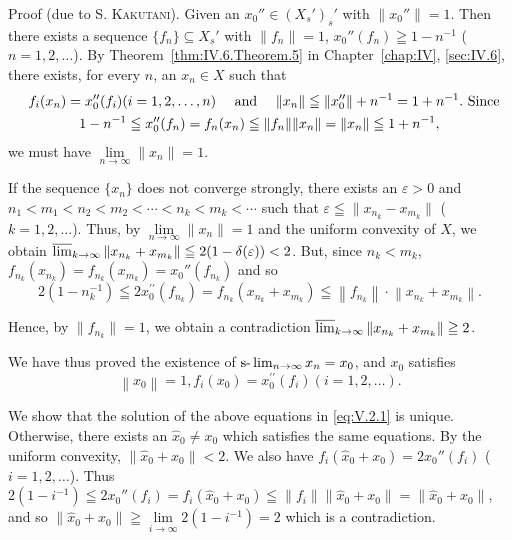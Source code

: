 Proof (due to S. \textsc{Kakutani}). Given an $x_0'' \in (X_s')_s'$ with $\|x_0''\| = 1$. Then there exists a sequence $\{f_n\} \subseteq X_s'$ with $\|f_n\| = 1$, $x_0''(f_n) \geqq 1 - n^{-1}$ ( $n = 1, 2, \ldots$). By Theorem~\ref{thm:IV.6.Theorem.5} in Chapter~\ref{chap:IV}, \ref{sec:IV.6}, there exists, for every $n$, an $x_n \in X$ such that 
\begin{gather}\quad f _{i} (x _{n})= x _{0} ^{\prime \prime} (f _{i}) (i = 1, 2, \dots , n) \quad \text{ and } \quad \| x _{n} \| \leqq \| x _{0} ^{\prime \prime} \| + n ^{-1} = 1 + n ^{-1}. \text{ Since } \notag
\\1 - n ^{-1} \leqq x _{0} ^{\prime \prime} (f _{n}) = f _{n} (x _{n}) \leqq \| f _{n} \| \| x _{n} \| = \| x _{n} \| \leqq 1 + n ^{-1}, \notag
\end{gather}
we must have $\lim\limits_{n\to \infty}\|x_n\| = 1.$ 

If the sequence $\{x_{n}\}$ does not converge strongly, there exists an $\varepsilon > 0$ and $n_{1} < m_{1} < n_{2} < m_{2} < \cdots < n_{k} < m_{k} < \cdots$ such that $\varepsilon \leqq \|x_{n_{k}} - x_{m_{k}}\|$ ( $k = 1, 2, \ldots$). Thus, by $\lim\limits_{n \to \infty} \|x_n\| = 1$ and the uniform convexity of $X$, we obtain $\varlimsup\limits_{k \to \infty} \|x_{n_{k}} + x_{m_{k}}\| \leqq 2(1 - \delta(\varepsilon)) < 2$. But, since $n_k < m_k$, $f_{n_{k}}(x_{n_{k}}) = f_{n_{k}}(x_{m_{k}}) = x_0''(f_{n_{k}})$ and so 
\[
2 \left(1 - n _{k} ^{-1}\right) \leqq 2 x _{0} ^{\prime \prime} \left(f _ {n _{k}}\right) = f _ {n _{k}} \left(x _ {n _{k}} + x _ {m _{k}}\right) \leqq \left\| f _ {n _{k}} \right\| \cdot \left\| x _ {n _{k}} + x _ {m _{k}} \right\|.
\]

Hence, by $\| f_{n_{k}} \| = 1$, we obtain a contradiction $\varlimsup\limits_{k \to \infty} \| x_{n_{k}} + x_{m_{k}} \| \geqq 2$. 

We have thus proved the existence of $\slim\limits_{n \to \infty} x_n = x_0$, and $x_0$ satisfies 
\begin{equation}\label{eq:V.2.1}
\left\| x _{0} \right\| = 1, f _{i} (x _{0}) = x _{0} ^{\prime \prime} (f _{i}) (i = 1, 2, \dots).
\end{equation}

We show that the solution of the above equations in \eqref{eq:V.2.1} is unique. Otherwise, there exists an $\hat{x}_0 \neq x_0$ which satisfies the same equations. By the uniform convexity, $\|\hat{x}_0 + x_0\| < 2$. We also have $f_i(\hat{x}_0 + x_0) = 2x_0''(f_i)$ ( $i = 1, 2, \ldots$). Thus 
$2(1 - i^{-1}) \leqq 2x_0''(f_i) = f_i(\hat{x}_0 + x_0) \leqq \|f_i\| \|\hat{x}_0 + x_0\| = \|\hat{x}_0 + x_0\|,$ and so $\|\hat{x}_0 + x_0\| \geqq \lim\limits_{i \to \infty} 2(1 - i^{-1}) = 2$ which is a contradiction. 

